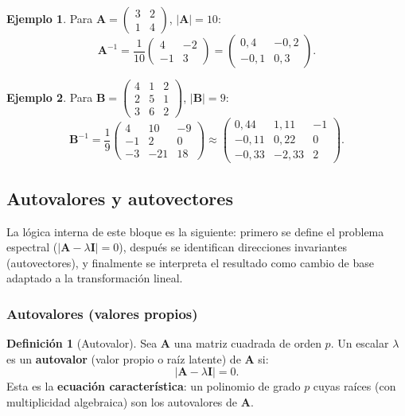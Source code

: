 \documentclass[12pt, a4paper]{article}
\theoremstyle{plain}
\theoremstyle{definition}
\newtheorem{definicion}[teorema]{Definición}
\newtheorem{ejemplo}{Ejemplo}[section]
\theoremstyle{remark}
\newcommand{\mat}[1]{\mathbf{#1}}
\begin{document}
\begin{ejemplo}
Para $\mat{A} = \begin{pmatrix}3&2\\1&4\end{pmatrix}$, $|\mat{A}|=10$:
\[
  \mat{A}^{-1} = \frac{1}{10}\begin{pmatrix}4&-2\\-1&3\end{pmatrix}
  = \begin{pmatrix}0{,}4&-0{,}2\\-0{,}1&0{,}3\end{pmatrix}.
\]
\end{ejemplo}

\begin{ejemplo}
Para $\mat{B} = \begin{pmatrix}4&1&2\\2&5&1\\3&6&2\end{pmatrix}$,
$|\mat{B}|=9$:
\[
  \mat{B}^{-1} = \frac{1}{9}\begin{pmatrix}4&10&-9\\-1&2&0\\-3&-21&18\end{pmatrix}
  \approx \begin{pmatrix}0{,}44&1{,}11&-1\\-0{,}11&0{,}22&0\\-0{,}33&-2{,}33&2\end{pmatrix}.
\]
\end{ejemplo}

\subsection{Autovalores y autovectores}

La lógica interna de este bloque es la siguiente: primero se define el problema
espectral ($|\mat{A}-\lambda\mat{I}|=0$), después se identifican direcciones
invariantes (autovectores), y finalmente se interpreta el resultado como cambio
de base adaptado a la transformación lineal.

\subsubsection{Autovalores (valores propios)}

\begin{definicion}[Autovalor]
Sea $\mat{A}$ una matriz cuadrada de orden $p$. Un escalar $\lambda$ es un
\textbf{autovalor} (valor propio o raíz latente) de $\mat{A}$ si:
\[
  |\mat{A} - \lambda\mat{I}| = 0.
\]
Esta es la \textbf{ecuación característica}: un polinomio de grado $p$ cuyas
raíces (con multiplicidad algebraica) son los autovalores de $\mat{A}$.
\end{definicion}
\end{document}
